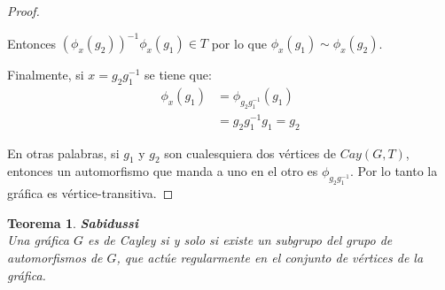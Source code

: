 \documentclass[11pt]{book}
\newtheorem{theorem}{Teorema}
\theoremstyle{definition}
\begin{document}
\begin{proof}
\begin{enumerate}
Entonces $(\phi_x(g_2))^{-1}\phi_x(g_1)\in T$ por lo que $\phi_x(g_1)
\sim \phi_x(g_2)$.

\end{enumerate}

Finalmente, si $x=g_2g_1^{-1}$ se tiene que: 
\begin{equation*}
  \begin{split}
    \phi_x(g_1)&=\phi_{g_2g_1^{-1}}(g_1)\\
    &=g_2g_1^{-1}g_1=g_2
  \end{split}
\end{equation*}

En otras palabras, si $g_1$ y $g_2$ son cualesquiera dos vértices de $Cay(G,T)$,
entonces un automorfismo que manda a uno en el otro es
$\phi_{g_{2}g_1^{-1}}$. Por lo tanto la gráfica es vértice-transitiva.  
\end{proof}


\begin{theorem}\textbf{Sabidussi}\\
Una gráfica $G$ es de Cayley si y solo si existe un subgrupo del
grupo de automorfismos de $G$, que actúe regularmente en el conjunto
de vértices de la gráfica.
\end{theorem}
\end{document}
